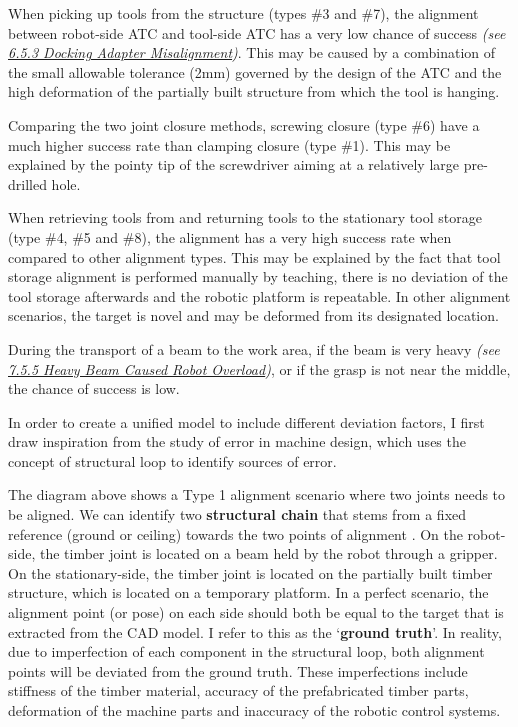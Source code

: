 \begin{description}[style=unboxed] %
	\item [Tight tolerance, deviation of partially assembled structure] When picking up tools from the structure (types $\#$3 and $\#$7), the alignment between robot-side ATC and tool-side ATC has a very low chance of success\textit{ (see \ul{6.5.3 Docking Adapter Misalignment})}. This may be caused by a combination of the small allowable tolerance (2mm) governed by the design of the ATC and the high deformation of the partially built structure from which the tool is hanging. 

	\item [Correction range] Comparing the two joint closure methods, screwing closure (type $\#$6) have a much higher success rate than clamping closure (type $\#$1). This may be explained by the pointy tip of the screwdriver aiming at a relatively large pre-drilled hole.

	\item [Deviation] When retrieving tools from and returning tools to the stationary tool storage (type $\#$4, $\#$5 and $\#$8), the alignment has a very high success rate when compared to other alignment types. This may be explained by the fact that tool storage alignment is performed manually by teaching, there is no deviation of the tool storage afterwards and the robotic platform is repeatable. In other alignment scenarios, the target is novel and may be deformed from its designated location.

	\item [Payload] During the transport of a beam to the work area, if the beam is very heavy \textit{(see \ul{7.5.5 Heavy Beam Caused Robot Overload})}, or if the grasp is not near the middle, the chance of success is low. 

\end{description}
In order to create a unified model to include different deviation factors, I first draw inspiration from the study of error in machine design, which uses the concept of structural loop to identify sources of error.



The diagram above shows a Type 1 alignment scenario where two joints needs to be aligned. We can identify two \textbf{structural chain }that stems from a fixed reference (ground or ceiling) towards the two points of alignment \parencite{slocumPrecisionMachineDesign1992}. On the robot-side, the timber joint is located on a beam held by the robot through a gripper. On the stationary-side, the timber joint is located on the partially built timber structure, which is located on a temporary platform. In a perfect scenario, the alignment point (or pose) on each side should both be equal to the target that is extracted from the CAD model. I refer to this as the ‘\textbf{ground truth}’. In reality, due to imperfection of each component in the structural loop, both alignment points will be deviated from the ground truth. These imperfections include stiffness of the timber material, accuracy of the prefabricated timber parts, deformation of the machine parts and inaccuracy of the robotic control systems. 

